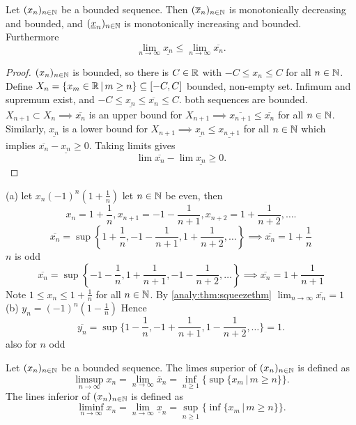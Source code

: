\documentclass[10pt, a4paper]{article}
\newcommand{\seq}[1][x]{(#1_n)_{n \in \N}}
\begin{document}
\begin{lemma}
    Let $\seq$ be a bounded sequence.
    Then $\seq[\overline{x}]$ is monotonically decreasing and bounded,
    and $\seq[\underline{x}]$ is monotonically increasing and bounded.
    Furthermore
    \[
    \lim_{n \to \infty}\underline{x_n} \leq \lim_{n \to \infty}\overline{x_n}.
    \]
    \begin{proof}
        $\seq$ is bounded,
        so there is $C \in \mathbb{R}$ with $-C \leq x_n \leq C$ for all $n \in \mathbb{N}$.
        Define $X_n = \{x_m \in \mathbb{R}\,|\, m \geq n\} \subseteq [-C, C]$ bounded,
        non-empty set.
        Infimum and supremum exist,
        and $-C \leq \underline{x_n} \leq \overline{x_n} \leq C$.
        both sequences are bounded.
        $X_{n + 1} \subset X_n \implies \overline{x_n}$ is an upper bound for $X_{n + 1} \implies \overline{x_{n + 1}} \leq \overline{x_n}$ for all $n \in \mathbb{N}$.
        Similarly,
        $\underline{x_n}$ is a lower bound for $X_{n + 1} \implies \underline{x_n} \leq \underline{x_{n + 1}}$ for all $n \in \mathbb{N}$ which implies $\overline{x_n} - \underline{x_n} \geq 0$.
        Taking limits gives
        \[
        \lim\overline{x_n} - \lim\underline{x_n} \geq 0.
        \]
    \end{proof}
\end{lemma}

\begin{example}
    (a) let $x_n (-1) ^ n \left(1 + \frac{1}{n}\right)$
    let $n \in \mathbb{N}$ be even,
    then
    \[
    x_n = 1 + \frac{1}{n}, x_{n + 1} = -1 - \frac{1}{n + 1}, x_{n + 2} = 1 + \frac{1}{n + 2}, \dotsc.
    \]
    \[
    \overline{x_n} = \sup\left\{1 + \frac{1}{n}, -1 - \frac{1}{n + 1}, 1 + \frac{1}{n + 2}, \dotsc\right\} \implies \overline{x_n} = 1 + \frac{1}{n}
    \]
    $n$ is odd
    \[
    \overline{x_n} = \sup\left\{-1 - \frac{1}{n}, 1 + \frac{1}{n + 1}, -1 - \frac{1}{n + 2}, \dotsc\right\} \implies \overline{x_n} = 1 + \frac{1}{n + 1}
    \]
    Note $1 \leq x_n \leq 1 + \frac{1}{n}$ for all $n \in \mathbb{N}$.
    By \autoref{analy:thm:squeezethm} $\lim_{n \to \infty}\overline{x_n} = 1$
    (b) $y_n = (-1) ^ n(1 - \frac{1}{n})$
    Hence
    \[
    \overline{y_n} = \sup\{1 - \frac{1}{n}, -1 + \frac{1}{n + 1}, 1 - \frac{1}{n + 2}, \dotsc\} = 1.
    \]
    also for $n$ odd
\end{example}

\begin{definition}
    Let $\seq$ be a bounded sequence.
    The limes superior of $\seq$ is defined as
    \[
    \limsup_{n \to \infty}{x_n} = \lim_{n \to \infty}\overline{x}_n = \inf_{n \geq 1}\{\sup{\{x_m\,|\, m \geq n\}}\}.
    \]
    The lines inferior of $\seq$ is defined as
    \[
    \liminf_{n \to \infty}{x_n} = \lim_{n \to \infty}{\underline{x}_n} = \sup_{n \geq 1}{\{\inf{\{x_m\,|\, m \geq n\}}\}}.
    \]
\end{definition}
\end{document}
